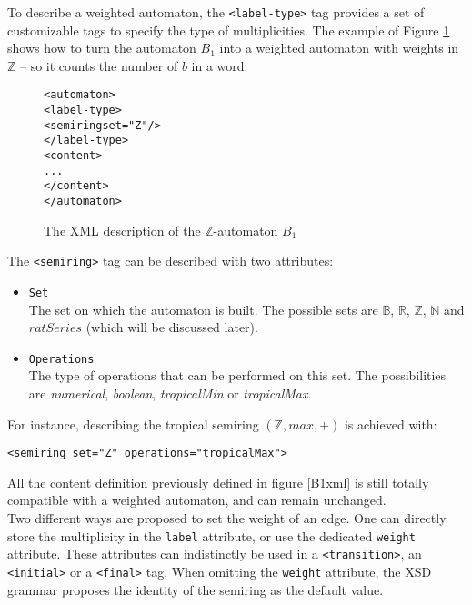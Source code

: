 \documentclass[a4paper]{article}
\def\typetagend{\texttt{</label-type>}}
\def\typetag{\texttt{<label-type>}}
\def\transitiontag{\texttt{<transition>}}
\def\finaltag{\texttt{<final>}}
\def\initialtag{\texttt{<initial>}}
\def\semiringtag{\texttt{<semiring>}}
\begin{document}
To describe a weighted automaton, the \typetag{} tag provides a set
of customizable tags to specify the type of multiplicities. The example
of Figure \ref{B1Zxml} shows how to turn the automaton $B_1$ into a
weighted automaton with weights in ${\mathbb Z}$ -- so it counts the
number of $b$ in a word.

{\small

\begin{figure}[h]
  \begin{center}
\begin{alltt}
<automaton>
  \typetag{}
     <semiring set="Z"/>
  \typetagend{}
  <content>
  ...
  </content>
</automaton>
\end{alltt}

\caption{The XML description of the $\mathbb{Z}$-automaton $B_1$}
\label{B1Zxml}
  \end{center}
\end{figure}

}

The \semiringtag{} tag can be described with two attributes:
\begin{itemize}
  \item \texttt{Set}\\
    The set on which the automaton is built. The possible sets are
    ${\mathbb B}$, ${\mathbb R}$, ${\mathbb Z}$, ${\mathbb N}$ and $ratSeries$
    (which will be discussed later).
  \item \texttt{Operations}\\
    The type of operations that can be performed on this set.
    The possibilities are \textit{numerical}, \textit{boolean}, \textit{tropicalMin}
    or \textit{tropicalMax}.
\end{itemize}

For instance, describing the tropical semiring $({\mathbb Z}, max, +)$
is achieved with:
\begin{center}
{\small
\verb|<semiring set="Z" operations="tropicalMax">|}
\end{center}

All the content definition previously defined in figure \ref{B1xml} is
still totally compatible with a weighted automaton, and can remain
unchanged.\\

Two different ways are proposed to set the weight of an edge. One can
directly store the multiplicity in the \verb|label| attribute, or use
the dedicated \verb|weight| attribute. These attributes can
indistinctly be used in a \transitiontag{}, an
\initialtag{} or a \finaltag{} tag. When omitting the
\verb|weight| attribute, the XSD grammar proposes the identity of
the semiring as the default value.\\\\
\end{document}

